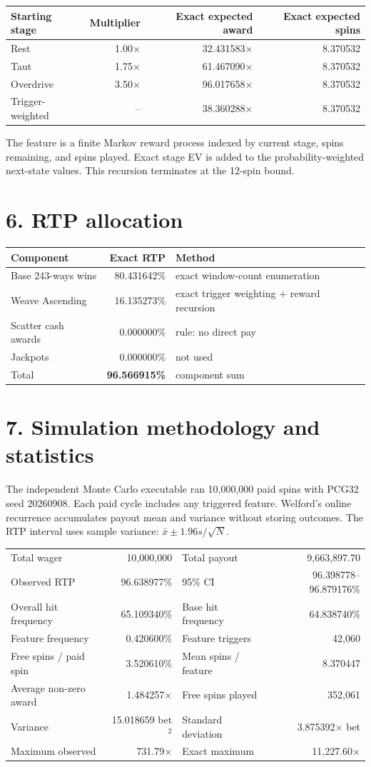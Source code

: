 \documentclass[10pt]{article}
\newcommand{\sectionbar}[1]{\vspace{8pt}{\color{acid}\rule{\linewidth}{1.5pt}}\vspace{-5pt}\section*{#1}}
\begin{document}
\begin{center}\begin{tabular}{l r r r}
\hline Starting stage & Multiplier & Exact expected award & Exact expected spins\\\hline
Rest & 1.00× & 32.431583× & 8.370532\\
Taut & 1.75× & 61.467090× & 8.370532\\
Overdrive & 3.50× & 96.017658× & 8.370532\\\hline
Trigger-weighted & -- & 38.360288× & 8.370532\\\hline
\end{tabular}\end{center}

The feature is a finite Markov reward process indexed by current stage, spins remaining, and spins played. Exact stage EV is added to the probability-weighted next-state values. This recursion terminates at the 12-spin bound.

\sectionbar{6. RTP allocation}
\begin{center}\begin{tabular}{l r l}
\hline Component & Exact RTP & Method\\\hline
Base 243-ways wins & 80.431642\% & exact window-count enumeration\\
Weave Ascending & 16.135273\% & exact trigger weighting + reward recursion\\
Scatter cash awards & 0.000000\% & rule: no direct pay\\
Jackpots & 0.000000\% & not used\\\hline
Total & \textbf{96.566915\%} & component sum\\\hline
\end{tabular}\end{center}

\sectionbar{7. Simulation methodology and statistics}
The independent Monte Carlo executable ran 10,000,000 paid spins with PCG32 seed 20260908. Each paid cycle includes any triggered feature. Welford's online recurrence accumulates payout mean and variance without storing outcomes. The RTP interval uses sample variance: $\bar{x}\pm1.96s/\sqrt{N}$.

\begin{center}\begin{tabular}{l r@{\qquad}l r}
\hline Total wager & 10,000,000 & Total payout & 9,663,897.70\\
Observed RTP & 96.638977\% & 95\% CI & 96.398778--96.879176\%\\
Overall hit frequency & 65.109340\% & Base hit frequency & 64.838740\%\\
Feature frequency & 0.420600\% & Feature triggers & 42,060\\
Free spins / paid spin & 3.520610\% & Mean spins / feature & 8.370447\\
Average non-zero award & 1.484257× & Free spins played & 352,061\\
Variance & 15.018659 bet$^2$ & Standard deviation & 3.875392× bet\\
Maximum observed & 731.79× & Exact maximum & 11,227.60×\\\hline
\end{tabular}\end{center}
\end{document}
